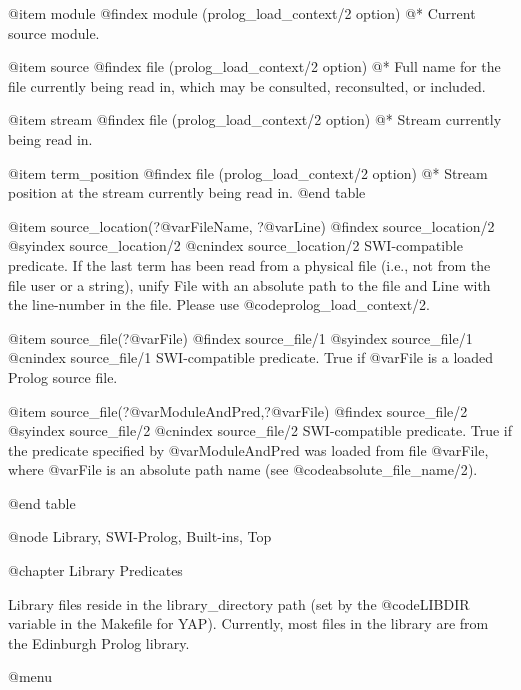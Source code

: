 {{{{{{{{{@item module
@findex module (prolog_load_context/2 option)
@*
Current source module.

@item source
@findex file (prolog_load_context/2 option)
@*
Full name for the file currently being read in, which may be consulted,
reconsulted, or included.

@item stream
@findex file (prolog_load_context/2 option)
@*
Stream currently being read in.

@item term_position
@findex file (prolog_load_context/2 option)
@*
Stream position at the stream currently being read in.
@end table

@item source_location(?@var{FileName}, ?@var{Line})
@findex source_location/2
@syindex source_location/2
@cnindex source_location/2
SWI-compatible predicate. If the last term has been read from a physical file (i.e., not from the file user or a string), unify File with an absolute path to the file and Line with the line-number in the file. Please use @code{prolog_load_context/2}.

@item source_file(?@var{File})
@findex source_file/1
@syindex source_file/1
@cnindex source_file/1
SWI-compatible predicate. True if @var{File} is a loaded Prolog source file.

@item source_file(?@var{ModuleAndPred},?@var{File})
@findex source_file/2
@syindex source_file/2
@cnindex source_file/2
SWI-compatible predicate. True if the predicate specified by @var{ModuleAndPred} was loaded from file @var{File}, where @var{File} is an absolute path name (see @code{absolute_file_name/2}).



@end table

@node Library, SWI-Prolog, Built-ins, Top

@chapter Library Predicates

Library files reside in the library_directory path (set by the
@code{LIBDIR} variable in the Makefile for YAP). Currently,
most files in the library are from the Edinburgh Prolog library. 

@menu
 
}}}}}}}}}
